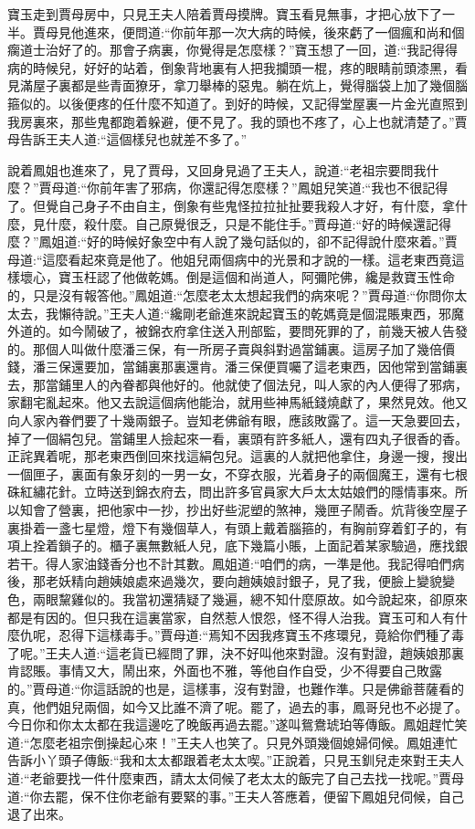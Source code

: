 \begin{parag}
    寶玉走到賈母房中，只見王夫人陪着賈母摸牌。寶玉看見無事，才把心放下了一半。賈母見他進來，便問道:“你前年那一次大病的時候，後來虧了一個瘋和尚和個瘸道士治好了的。那會子病裏，你覺得是怎麼樣？”寶玉想了一回，道:“我記得得病的時候兒，好好的站着，倒象背地裏有人把我攔頭一棍，疼的眼睛前頭漆黑，看見滿屋子裏都是些青面獠牙，拿刀舉棒的惡鬼。躺在炕上，覺得腦袋上加了幾個腦箍似的。以後便疼的任什麼不知道了。到好的時候，又記得堂屋裏一片金光直照到我房裏來，那些鬼都跑着躲避，便不見了。我的頭也不疼了，心上也就清楚了。”賈母告訴王夫人道:“這個樣兒也就差不多了。”
\end{parag}


\begin{parag}
    說着鳳姐也進來了，見了賈母，又回身見過了王夫人，說道:“老祖宗要問我什麼？”賈母道:“你前年害了邪病，你還記得怎麼樣？”鳳姐兒笑道:“我也不很記得了。但覺自己身子不由自主，倒象有些鬼怪拉拉扯扯要我殺人才好，有什麼，拿什麼，見什麼，殺什麼。自己原覺很乏，只是不能住手。”賈母道:“好的時候還記得麼？”鳳姐道:“好的時候好象空中有人說了幾句話似的，卻不記得說什麼來着。”賈母道:“這麼看起來竟是他了。他姐兒兩個病中的光景和才說的一樣。這老東西竟這樣壞心，寶玉枉認了他做乾媽。倒是這個和尚道人，阿彌陀佛，纔是救寶玉性命的，只是沒有報答他。”鳳姐道:“怎麼老太太想起我們的病來呢？”賈母道:“你問你太太去，我懶待說。”王夫人道:“纔剛老爺進來說起寶玉的乾媽竟是個混賬東西，邪魔外道的。如今鬧破了，被錦衣府拿住送入刑部監，要問死罪的了，前幾天被人告發的。那個人叫做什麼潘三保，有一所房子賣與斜對過當鋪裏。這房子加了幾倍價錢，潘三保還要加，當鋪裏那裏還肯。潘三保便買囑了這老東西，因他常到當鋪裏去，那當鋪里人的內眷都與他好的。他就使了個法兒，叫人家的內人便得了邪病，家翻宅亂起來。他又去說這個病他能治，就用些神馬紙錢燒獻了，果然見效。他又向人家內眷們要了十幾兩銀子。豈知老佛爺有眼，應該敗露了。這一天急要回去，掉了一個絹包兒。當鋪里人撿起來一看，裏頭有許多紙人，還有四丸子很香的香。正詫異着呢，那老東西倒回來找這絹包兒。這裏的人就把他拿住，身邊一搜，搜出一個匣子，裏面有象牙刻的一男一女，不穿衣服，光着身子的兩個魔王，還有七根硃紅繡花針。立時送到錦衣府去，問出許多官員家大戶太太姑娘們的隱情事來。所以知會了營裏，把他家中一抄，抄出好些泥塑的煞神，幾匣子鬧香。炕背後空屋子裏掛着一盞七星燈，燈下有幾個草人，有頭上戴着腦箍的，有胸前穿着釘子的，有項上拴着鎖子的。櫃子裏無數紙人兒，底下幾篇小賬，上面記着某家驗過，應找銀若干。得人家油錢香分也不計其數。鳳姐道:“咱們的病，一準是他。我記得咱們病後，那老妖精向趙姨娘處來過幾次，要向趙姨娘討銀子，見了我，便臉上變貌變色，兩眼黧雞似的。我當初還猜疑了幾遍，總不知什麼原故。如今說起來，卻原來都是有因的。但只我在這裏當家，自然惹人恨怨，怪不得人治我。寶玉可和人有什麼仇呢，忍得下這樣毒手。”賈母道:“焉知不因我疼寶玉不疼環兒，竟給你們種了毒了呢。”王夫人道:“這老貨已經問了罪，決不好叫他來對證。沒有對證，趙姨娘那裏肯認賬。事情又大，鬧出來，外面也不雅，等他自作自受，少不得要自己敗露的。”賈母道:“你這話說的也是，這樣事，沒有對證，也難作準。只是佛爺菩薩看的真，他們姐兒兩個，如今又比誰不濟了呢。罷了，過去的事，鳳哥兒也不必提了。今日你和你太太都在我這邊吃了晚飯再過去罷。”遂叫鴛鴦琥珀等傳飯。鳳姐趕忙笑道:“怎麼老祖宗倒操起心來！”王夫人也笑了。只見外頭幾個媳婦伺候。鳳姐連忙告訴小丫頭子傳飯:“我和太太都跟着老太太喫。”正說着，只見玉釧兒走來對王夫人道:“老爺要找一件什麼東西，請太太伺候了老太太的飯完了自己去找一找呢。”賈母道:“你去罷，保不住你老爺有要緊的事。”王夫人答應着，便留下鳳姐兒伺候，自己退了出來。

\end{parag}
